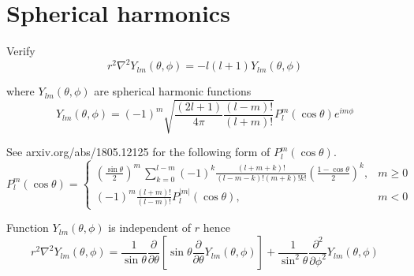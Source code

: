 

\section*{Spherical harmonics}

Verify
\begin{equation*}
r^2\nabla^2Y_{lm}(\theta,\phi)=-l(l+1)Y_{lm}(\theta,\phi)
\end{equation*}

where $Y_{lm}(\theta,\phi)$ are spherical harmonic functions
\begin{equation*}
Y_{lm}(\theta,\phi)=(-1)^m\sqrt{\frac{(2l+1)}{4\pi}\frac{(l-m)!}{(l+m)!}}
P_l^m(\cos\theta)e^{im\phi}
\end{equation*}

See arxiv.org/abs/1805.12125 for the following form of $P_l^m(\cos\theta)$.
\begin{equation*}
P_l^m(\cos\theta)=\begin{cases}\displaystyle
\left(\frac{\sin\theta}{2}\right)^m\,\sum_{k=0}^{l-m}
(-1)^k\frac{(l+m+k)!}{(l-m-k)!(m+k)!k!}
\left(\frac{1-\cos\theta}{2}\right)^k, & m\ge0
\\[4ex]
\displaystyle(-1)^m\frac{(l+m)!}{(l-m)!}P_l^{|m|}(\cos\theta), & m<0
\end{cases}
\end{equation*}

Function $Y_{lm}(\theta,\phi)$ is independent of $r$ hence
\begin{equation*}
r^2\nabla^2Y_{lm}(\theta,\phi)=\frac{1}{\sin\theta}\frac{\partial}{\partial\theta}
\left[\sin\theta\frac{\partial}{\partial\theta}Y_{lm}(\theta,\phi)\right]
+\frac{1}{\sin^2\theta}\frac{\partial^2}{\partial\phi^2}Y_{lm}(\theta,\phi)
\end{equation*}


